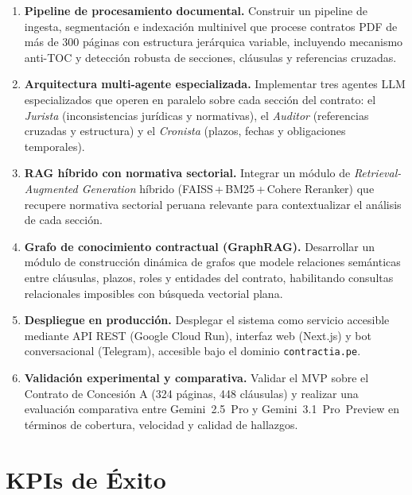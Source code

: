\begin{enumerate}
    \item \textbf{Pipeline de procesamiento documental.}
    Construir un pipeline de ingesta, segmentación e indexación multinivel que
    procese contratos PDF de más de 300 páginas con estructura jerárquica variable,
    incluyendo mecanismo anti-TOC y detección robusta de secciones, cláusulas y
    referencias cruzadas.

    \item \textbf{Arquitectura multi-agente especializada.}
    Implementar tres agentes LLM especializados que operen en paralelo sobre cada
    sección del contrato: el \textit{Jurista} (inconsistencias jurídicas y
    normativas), el \textit{Auditor} (referencias cruzadas y estructura) y el
    \textit{Cronista} (plazos, fechas y obligaciones temporales).

    \item \textbf{RAG híbrido con normativa sectorial.}
    Integrar un módulo de \textit{Retrieval-Augmented Generation} híbrido
    (FAISS\,+\,BM25\,+\,Cohere Reranker) que recupere normativa sectorial peruana
    relevante para contextualizar el análisis de cada sección.

    \item \textbf{Grafo de conocimiento contractual (GraphRAG).}
    Desarrollar un módulo de construcción dinámica de grafos que modele relaciones
    semánticas entre cláusulas, plazos, roles y entidades del contrato, habilitando
    consultas relacionales imposibles con búsqueda vectorial plana.

    \item \textbf{Despliegue en producción.}
    Desplegar el sistema como servicio accesible mediante API REST (Google Cloud
    Run), interfaz web (Next.js) y bot conversacional (Telegram), accesible bajo
    el dominio \texttt{contractia.pe}.

    \item \textbf{Validación experimental y comparativa.}
    Validar el MVP sobre el Contrato de Concesión A (324 páginas, 448 cláusulas)
    y realizar una evaluación comparativa entre Gemini~2.5~Pro y
    Gemini~3.1~Pro~Preview en términos de cobertura, velocidad y calidad de
    hallazgos.
\end{enumerate}

\section{KPIs de Éxito}

